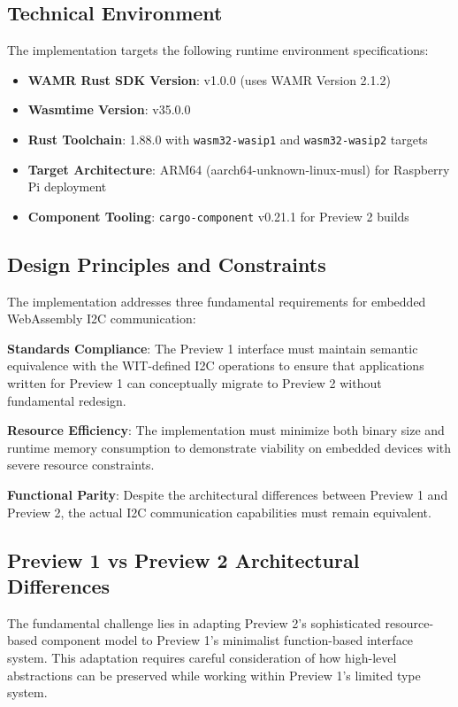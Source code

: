 \subsection{Technical Environment}

The implementation targets the following runtime environment specifications:

\begin{itemize}
    \item \textbf{WAMR Rust SDK Version}: v1.0.0 (uses WAMR Version 2.1.2)
    \item \textbf{Wasmtime Version}: v35.0.0
    \item \textbf{Rust Toolchain}: 1.88.0 with \texttt{wasm32-wasip1} and \texttt{wasm32-wasip2} targets
    \item \textbf{Target Architecture}: ARM64 (aarch64-unknown-linux-musl) for Raspberry Pi deployment
    \item \textbf{Component Tooling}: \texttt{cargo-component} v0.21.1 for Preview 2 builds
\end{itemize}

\subsection{Design Principles and Constraints}

The implementation addresses three fundamental requirements for embedded WebAssembly I2C communication:

\textbf{Standards Compliance}: The Preview 1 interface must maintain semantic equivalence with the WIT-defined I2C operations to ensure that applications written for Preview 1 can conceptually migrate to Preview 2 without fundamental redesign.

\textbf{Resource Efficiency}: The implementation must minimize both binary size and runtime memory consumption to demonstrate viability on embedded devices with severe resource constraints.

\textbf{Functional Parity}: Despite the architectural differences between Preview 1 and Preview 2, the actual I2C communication capabilities must remain equivalent.

\subsection{Preview 1 vs Preview 2 Architectural Differences}

The fundamental challenge lies in adapting Preview 2's sophisticated resource-based component model to Preview 1's minimalist function-based interface system. This adaptation requires careful consideration of how high-level abstractions can be preserved while working within Preview 1's limited type system.

